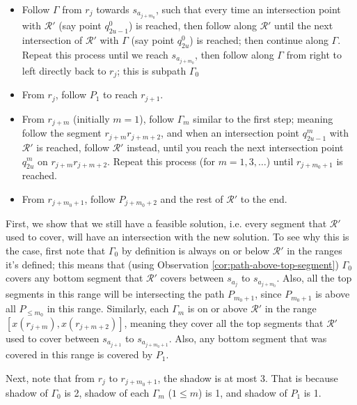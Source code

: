 \documentclass[pdflatex,sn-mathphys-num]{sn-jnl}
\theoremstyle{thmstyleone}
\begin{document}
    \label{alg:zig-zag-path}
    \begin{itemize}
        \item Follow $\Gamma$ from $r_{j}$ towards $s_{a_{j+m_0}}$, such that every time an intersection point with $\mathcal R'$ (say point $q^0_{2u - 1}$) is reached, then follow along $\mathcal R'$ until the next intersection of $\mathcal R'$ with $\Gamma$ (say point $q^0_{2u}$) is reached; then continue along $\Gamma$. Repeat this process until we reach $s_{a_{j+m_0}}$, then follow along $\Gamma$ from right to left directly back to $r_{j}$; this is subpath $\Gamma_0$

	    \item From $r_{j}$, follow $P_1$ to reach $r_{j + 1}$.
	    
	    \item From $r_{j + m}$ (initially $m = 1$), follow $\Gamma_m$ similar to the first step; meaning follow the segment $r_{j + m}\left. r_{j + m + 2}\right.$, and when an intersection point $q^m_{2u - 1}$ with $\mathcal R'$ is reached, follow $\mathcal R'$ instead, until you reach the next intersection point $q^m_{2u}$ on $r_{j+m}r_{j+m+2}$. Repeat this process (for $m = 1, 3, \dots$) until $r_{j + m_0 + 1}$ is reached. 
	    \item From $r_{j + m_0 + 1}$, follow $P_{j+m_0+2}$ and the rest of $\mathcal R'$ to the end.
	\end{itemize}
        First, we show that we still have a feasible solution, i.e.
        every segment that $\mathcal R'$ used to cover, will have an intersection with the new solution. To see why this is the case, first note that $\Gamma_0$ by definition is always on or below $\mathcal R'$ in the ranges it's defined; this means that (using Observation \ref{cor:path-above-top-segment}) $\Gamma_0$ covers any bottom segment that $\mathcal R'$ covers between $s_{a_{j}}$ to $s_{a_{j+m_0}}$. Also, all the top segments in this range  will be intersecting the path $P_{m_0+1}$, since $P_{m_0+1}$ is above all $P_{\leq m_0}$ in this range.
        Similarly, each $\Gamma_m$ is on or above $\mathcal R'$ in the range $[x(r_{j+m}),x(r_{j+m+2})]$, meaning they cover all the top segments that $\mathcal R'$ used to cover between $s_{a_{j+1}}$ to $s_{a_{j+m_0+1}}$. Also, any bottom segment that was covered in this range is covered by $P_1$. 

		Next, note that from $r_{j}$ to $r_{j+m_0+1}$, the shadow is at most 3. That is because shadow of $\Gamma_0$ is 2, shadow of each $\Gamma_m$ ($1\leq m$) is 1, and shadow of $P_1$ is 1.
\end{document}

